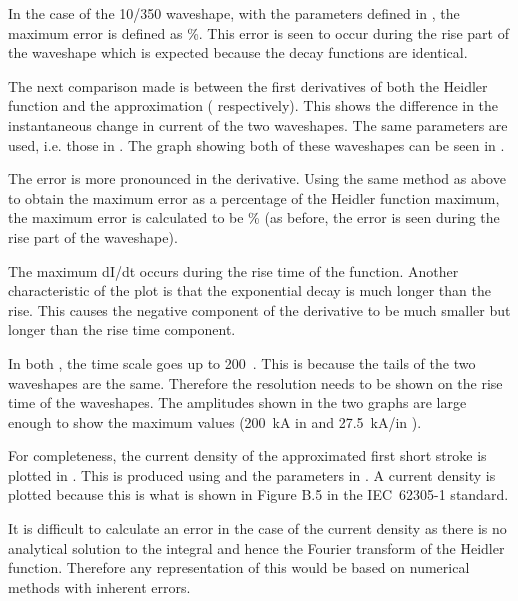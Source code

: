 In the case of the 10/350 waveshape, with the parameters defined in , the maximum error is defined as \unskip \%. This error is seen to occur during the rise part of the waveshape which is expected because the decay functions are identical.

The next comparison made is between the first derivatives of both the Heidler function and the approximation ( respectively). This shows the difference in the instantaneous change in current of the two waveshapes. The same parameters are used, i.e. those in . The graph showing both of these waveshapes can be seen in .

The error is more pronounced in the derivative. Using the same method as above to obtain the maximum error as a percentage of the Heidler function maximum, the maximum error is calculated to be \unskip \% (as before, the error is seen during the rise part of the waveshape).

The maximum dI/dt occurs during the rise time of the function. Another characteristic of the plot is that the exponential decay is much longer than the rise. This causes the negative component of the derivative to be much smaller but longer than the rise time component.

In both , the time scale goes up to 200~\usec. This is because the tails of the two waveshapes are the same. Therefore the resolution needs to be shown on the rise time of the waveshapes. The amplitudes shown in the two graphs are large enough to show the maximum values (200~kA in  and 27.5~kA/\usec in ).

For completeness, the current density of the approximated first short stroke is plotted in . This is produced using  and the parameters in . A current density is plotted because this is what is shown in Figure B.5 in the IEC~62305-1 standard.

It is difficult to calculate an error in the case of the current density as there is no analytical solution to the integral and hence the Fourier transform of the Heidler function. Therefore any representation of this would be based on numerical methods with inherent errors.

